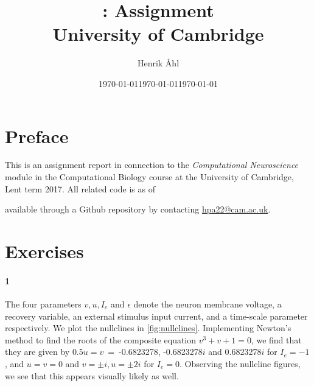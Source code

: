 \documentclass[10pt]{article}\usepackage[]{graphicx}\usepackage[]{color}
\title{
  \bf \course: Assignment \ass \\[1em]
  \small{University of Cambridge}
}
\author{Henrik Åhl}
\date{\today}
\theoremstyle{plain}
\newcommand{\course}{Computational Neuroscience}
\newcommand{\term}{Lent term 2017}
\begin{document}
\date{\today}
\maketitle
\setcounter{page}{1}
\setcounter{section}{1}


\maketitle
\begin{multicols*}{2}
	\section*{Preface}
	This is an assignment report in connection to the \textit{\course}
	module in the Computational Biology course at the University of Cambridge,
	\term. All related code is as of \date{\today} available through a
	Github repository by contacting \href{mailto:hpa22@cam.ac.uk}{hpa22@cam.ac.uk}.
	\section*{Exercises}
	\paragraph*{1}
	
	The four parameters $v, u, I_e$ and $\epsilon$ denote the neuron membrane voltage, a recovery variable, an external stimulus input current, and a time-scale parameter respectively. We plot the nullclines in \cref{fig:nullclines}. Implementing Newton's method to find the roots of the composite equation $v^3 + v + 1 = 0$, we find that they are given by $0.5u = v~=~$-0.6823278, -0.6823278$i$ and 0.6823278$i$ for $I_e = -1$, and $u = v = 0$ and $v = \pm i, u = \pm 2i$ for $I_e = 0$. Observing the nullcline figures, we see that this appears visually likely as well. 
	
\begin{Schunk}
\begin{figure}[H]


\end{figure}
\end{Schunk}
\end{multicols*}
\end{document}
